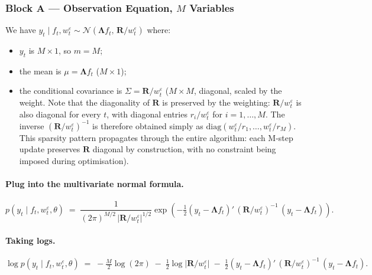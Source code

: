 \documentclass[11pt, a4paper, oneside]{article}
\newcommand{\mL}{\boldsymbol{\Lambda}}
\newcommand{\mR}{\mathbf{R}}
\begin{document}
\subsubsection*{Block A — Observation Equation, $M$ Variables}

We have $y_t \mid f_t, w^\varepsilon_t \sim \mathcal{N}(\mL f_t,\, \mR/w^\varepsilon_t)$
where:
\begin{itemize}[leftmargin=1.5em, itemsep=2pt]
    \item $y_t$ is $M \times 1$, so $m = M$;
    \item the mean is $\mu = \mL f_t$ ($M \times 1$);
    \item the conditional covariance is $\Sigma = \mR/w^\varepsilon_t$
          ($M \times M$, diagonal, scaled by the weight. 
          Note that the diagonality of $\mR$ is preserved by the weighting:
          $\mR/w^\varepsilon_t$ is also diagonal for every $t$, with diagonal
          entries $r_i/w^\varepsilon_t$ for $i = 1, \ldots, M$. The inverse
          $(\mR/w^\varepsilon_t)^{-1}$ is therefore obtained simply as
          $\mathrm{diag}(w^\varepsilon_t/r_1, \ldots, w^\varepsilon_t/r_M)$.
          This sparsity pattern propagates through the entire algorithm: each
          M-step update preserves $\mR$ diagonal by construction, with no
          constraint being imposed during optimisation).
\end{itemize}

\paragraph{Plug into the multivariate normal formula.}
\[
p(y_t \mid f_t, w^\varepsilon_t, \theta)
\;=\; \frac{1}{(2\pi)^{M/2}\, \big|\mR/w^\varepsilon_t\big|^{1/2}}
\exp\!\left(-\tfrac{1}{2}(y_t - \mL f_t)'\,(\mR/w^\varepsilon_t)^{-1}\,(y_t - \mL f_t)\right).
\]

\paragraph{Taking logs.}
\[
\log p(y_t \mid f_t, w^\varepsilon_t, \theta)
\;=\; -\tfrac{M}{2}\log(2\pi) \;-\; \tfrac{1}{2}\log\!\big|\mR/w^\varepsilon_t\big|
\;-\; \tfrac{1}{2}(y_t - \mL f_t)'\,(\mR/w^\varepsilon_t)^{-1}\,(y_t - \mL f_t).
\]
\end{document}
